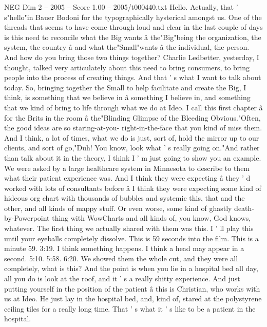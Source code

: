 \begin{textsample}{NEG Dim 2 – 2005 – Score 1.00 – 2005/t000440.txt}  \label{ex:f2_neg_076}
Hello.
Actually, that ' s"hello"in Bauer Bodoni for the typographically hysterical amongst us.
One of the threads that seems to have come through loud and clear in the last couple of days is this need to reconcile what the Big wants â the"Big"being the organization, the system, the country â and what the"Small"wants â the individual, the person.
And how do you bring those two things together?
Charlie Ledbetter, yesterday, I thought, talked very articulately about this need to bring consumers, to bring people into the process of creating things.
And that ' s what I want to talk about today.
So, bringing together the Small to help facilitate and create the Big, I think, is something that we believe in â something I believe in, and something that we kind of bring to life through what we do at Ideo.
I call this first chapter â for the Brits in the room â the"Blinding Glimpse of the Bleeding Obvious."Often, the good ideas are so staring-at-you- right-in-the-face that you kind of miss them.
And I think, a lot of times, what we do is just, sort of, hold the mirror up to our clients, and sort of go,"Duh!
You know, look what ' s really going on."And rather than talk about it in the theory, I think I ' m just going to show you an example.
We were asked by a large healthcare system in Minnesota to describe to them what their patient experience was.
And I think they were expecting â they ' d worked with lots of consultants before â I think they were expecting some kind of hideous org chart with thousands of bubbles and systemic this, that and the other, and all kinds of mappy stuff.
Or even worse, some kind of ghastly death-by-Powerpoint thing with WowCharts and all kinds of, you know, God knows, whatever.
The first thing we actually shared with them was this.
I ' ll play this until your eyeballs completely dissolve.
This is 59 seconds into the film.
This is a minute 59. 3:19.
I think something happens.
I think a head may appear in a second. 5:10. 5:58. 6:20.
We showed them the whole cut, and they were all completely, what is this?
And the point is when you lie in a hospital bed all day, all you do is look at the roof, and it ' s a really shitty experience.
And just putting yourself in the position of the patient â this is Christian, who works with us at Ideo.
He just lay in the hospital bed, and, kind of, stared at the polystyrene ceiling tiles for a really long time.
That ' s what it ' s like to be a patient in the hospital.

\end{textsample}
